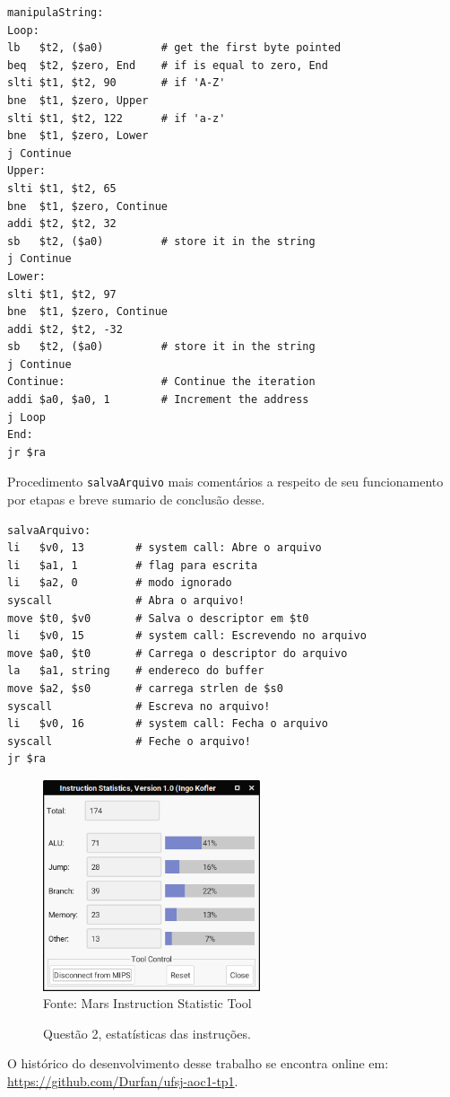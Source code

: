 \documentclass[12pt,a4paper]{article}
\numberwithin{figure}{subsection}
\numberwithin{table}{subsection}
\begin{document}
\vspace{-0.5cm}
\begin{lstlisting}[caption={manipulaString}]
manipulaString:
Loop:  
lb   $t2, ($a0)         # get the first byte pointed
beq  $t2, $zero, End    # if is equal to zero, End
slti $t1, $t2, 90       # if 'A-Z'
bne  $t1, $zero, Upper
slti $t1, $t2, 122      # if 'a-z'
bne  $t1, $zero, Lower
j Continue
Upper:
slti $t1, $t2, 65
bne  $t1, $zero, Continue
addi $t2, $t2, 32  
sb   $t2, ($a0)         # store it in the string
j Continue
Lower:
slti $t1, $t2, 97
bne  $t1, $zero, Continue
addi $t2, $t2, -32  
sb   $t2, ($a0)         # store it in the string
j Continue
Continue:               # Continue the iteration
addi $a0, $a0, 1        # Increment the address
j Loop
End:    
jr $ra
\end{lstlisting}

Procedimento \texttt{salvaArquivo} mais comentários a respeito de seu funcionamento por etapas e breve sumario de conclusão desse.

\pagebreak

\vspace{-0.5cm}
\begin{lstlisting}[caption={salvaArquivo}]
salvaArquivo:
li   $v0, 13        # system call: Abre o arquivo
li   $a1, 1         # flag para escrita
li   $a2, 0         # modo ignorado
syscall             # Abra o arquivo!
move $t0, $v0       # Salva o descriptor em $t0 
li   $v0, 15        # system call: Escrevendo no arquivo
move $a0, $t0       # Carrega o descriptor do arquivo 
la   $a1, string    # endereco do buffer
move $a2, $s0       # carrega strlen de $s0
syscall             # Escreva no arquivo!
li   $v0, 16        # system call: Fecha o arquivo
syscall             # Feche o arquivo!
jr $ra
\end{lstlisting}

\lipsum[1]

\begin{figure}[H]
	\centering
	\caption{Questão 2, estatísticas das instruções.}
	\vspace{0.2cm}
	\includegraphics[width=242px]{questao2_stats}
	\\\footnotesize Fonte: Mars Instruction Statistic Tool
\end{figure}


\pagebreak

\begin{flushleft}
	\nocite{*}
	
	\vfill
	O histórico do desenvolvimento desse trabalho se encontra online em:\\ \url{https://github.com/Durfan/ufsj-aoc1-tp1}.
\end{flushleft}
\end{document}
